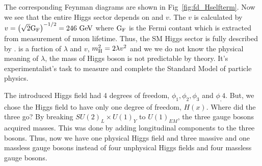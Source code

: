The corresponding Feynman diagrams are shown in Fig~\ref{fig:fd_Hselfterm}. 
Now we see that the entire Higgs sector depends on \mHi and $v$.
The $v$ is calculated by $v = \left( \sqrt{2} \mathrm{G_{\mathrm{F}}} \right)^{-1/2} = 246~\mathrm{Ge\kern -0.1em V}$  
where $\mathrm{G_{\mathrm{F}}}$ is the Fermi contant which is extracted from measurement 
of muon lifetime. 
Thus, the SM Higgs sector is fully described by \mHi. 
\mHi is a fuction of $\lambda$ and $v$,  $m_{\mathrm{H}}^2 = 2 \lambda v^2$
and we we do not know the physical meaning of $\lambda$, 
the mass of Higgs boson is not predictable by theory.
It's experimentalist's task to measure \mHi{} and 
complete the Standard Model of particle physics.

The introduced Higgs field had 4 degrees of freedom, $\phi_1, \phi_2, \phi_3$ 
and $\phi_,4$. But, we chose the Higgs field to have only one degree of freedom, $H(x)$.  
Where did the three go? 
By breaking $SU(2)_L \times U(1)_Y$ to $U(1)_{EM}$, the three gauge 
bosons acquired masses. This was done by adding longitudinal components 
to the three bosons. Thus, now we have one physical Higgs field and 
three massive and one massless gauge bosons instead of four unphysical 
Higgs fields and four massless gauge bosons.

